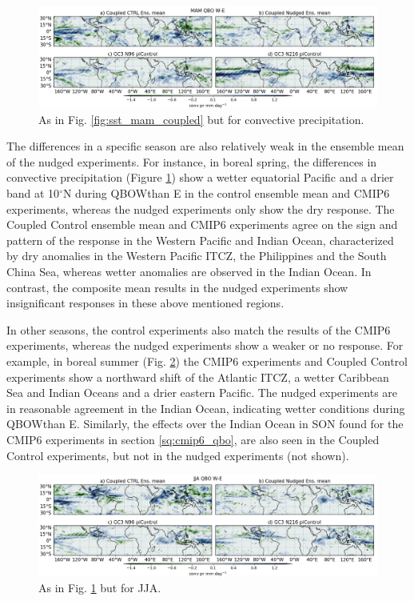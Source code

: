 \begin{figure}[t!]
\centering
 \includegraphics[width=\linewidth]{figures/conv_prseasonal_mamqbowqboe.png}
\caption[ Convective precipitation response in MAM]{As in Fig. \ref{fig:sst_mam_coupled} but for convective precipitation.}
\label{fig:conv_pr_mam_coupled}
\end{figure}

The differences in a specific season are also relatively weak in the ensemble mean of the nudged experiments. 
For instance, in boreal spring, the differences in convective precipitation (Figure \ref{fig:conv_pr_mam_coupled}) show a wetter equatorial Pacific and a drier band at 10$^\circ$N during QBOWthan E in the control ensemble mean and CMIP6 experiments, whereas the nudged experiments only show the dry response. The Coupled Control ensemble mean and CMIP6 experiments agree on the sign and pattern of the response in the Western Pacific and Indian Ocean, characterized by dry anomalies in the Western Pacific ITCZ, the Philippines and the South China Sea, whereas wetter anomalies are observed in the Indian Ocean. 
In contrast, the composite mean results in the nudged experiments show insignificant responses in these above mentioned regions. 



In other seasons, the control experiments also match the results of the CMIP6 experiments, whereas the nudged experiments show a weaker or no response. For example, in boreal summer (Fig. \ref{fig:conv_pr_jja_coupled}) the CMIP6 experiments and Coupled Control experiments show a northward shift of the Atlantic ITCZ, a wetter Caribbean Sea and Indian Oceans and a drier eastern Pacific. The nudged experiments are in reasonable agreement in the Indian Ocean, indicating wetter conditions during QBOWthan E.
Similarly, the effects over the Indian Ocean in SON found for the CMIP6 experiments in section \ref{sq:cmip6_qbo}, are also seen in the Coupled Control experiments, but not in the nudged experiments (not shown).


\begin{figure}[t!]
\centering
 \includegraphics[width=\linewidth]{figures/conv_prseasonal_jjaqbowqboe.png}
\caption[ Convective precipitation response in JJA]{As in Fig. \ref{fig:conv_pr_mam_coupled} but for JJA.}
\label{fig:conv_pr_jja_coupled}
\end{figure}

